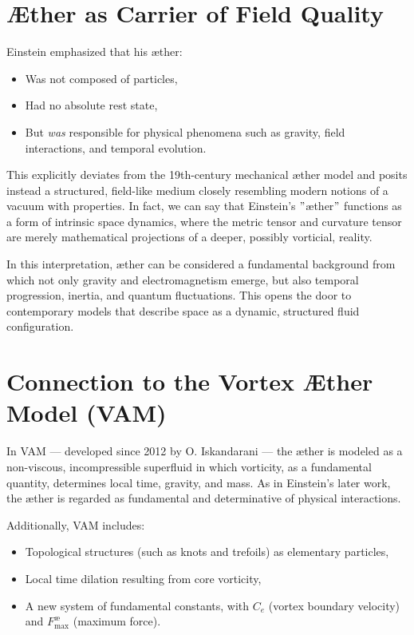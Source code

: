 \section{Æther as Carrier of Field Quality}

    Einstein emphasized that his æther:
    \begin{itemize}
        \item Was not composed of particles,
        \item Had no absolute rest state,
        \item But \emph{was} responsible for physical phenomena such as gravity, field interactions, and temporal evolution.
    \end{itemize}

    This explicitly deviates from the 19th-century mechanical æther model and posits instead a structured, field-like medium closely resembling modern notions of a vacuum with properties. In fact, we can say that Einstein's \("\)æther\("\) functions as a form of intrinsic space dynamics, where the metric tensor and curvature tensor are merely mathematical projections of a deeper, possibly vorticial, reality.

    In this interpretation, æther can be considered a fundamental background from which not only gravity and electromagnetism emerge, but also temporal progression, inertia, and quantum fluctuations. This opens the door to contemporary models that describe space as a dynamic, structured fluid configuration.

    \section{Connection to the Vortex Æther Model (VAM)}

    In VAM — developed since 2012 by O. Iskandarani — the æther is modeled as a non-viscous, incompressible superfluid in which vorticity, as a fundamental quantity, determines local time, gravity, and mass. As in Einstein's later work, the æther is regarded as fundamental and determinative of physical interactions.

    Additionally, VAM includes:
    \begin{itemize}
        \item Topological structures (such as knots and trefoils) as elementary particles,
        \item Local time dilation resulting from core vorticity,
        \item A new system of fundamental constants, with $C_e$ (vortex boundary velocity) and $F^{\text{\ae}}_{\text{max}}$ (maximum force).
    \end{itemize}

